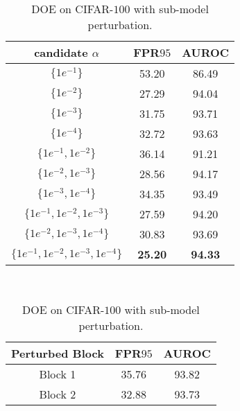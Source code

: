 \documentclass{article} \usepackage{iclr2022_conference,times}
\begin{document}
\begin{table}[t]
\centering
\parbox{.5\linewidth}{
\centering
\scriptsize
\caption{DOE on CIFAR-$100$ with various $\alpha$.} \label{tab: hyper_alpha}
\vspace{5pt}
{
\begin{tabular}{c|cc}
\toprule[1.5pt]
 candidate $\alpha$                     & FPR$95$                & AUROC                  \\
\midrule[0.6pt]
$\{1e^{-1}\}$                           & 53.20                  & 86.49                  \\
$\{1e^{-2}\}$                           & 27.29                  & 94.04                  \\
$\{1e^{-3}\}$                           & 31.75                  & 93.71                  \\
$\{1e^{-4}\}$                           & 32.72                  & 93.63                 \\
$\{1e^{-1},1e^{-2}\}$                   & 36.14                  & 91.21                  \\
$\{1e^{-2},1e^{-3}\}$                   & 28.56                  & 94.17                  \\
$\{1e^{-3},1e^{-4}\}$                   & 34.35                  & 93.49                  \\
$\{1e^{-1},1e^{-2},1e^{-3}\}$           & 27.59                  & 94.20                  \\
$\{1e^{-2},1e^{-3},1e^{-4}\}$           & 30.83                  & 93.69                  \\
\cellcolor{greyL}$\{1e^{-1},1e^{-2},1e^{-3},1e^{-4}\}$   & \cellcolor{greyL}\textbf{25.20}                  & \cellcolor{greyL}\textbf{94.33}                  \\
\bottomrule[1.5pt]      
\end{tabular}
}}~~~~~~~~~~~~~~~
\centering
\parbox{.5\linewidth}{
\centering
\scriptsize
\caption{DOE on CIFAR-$100$ with sub-model perturbation.} \label{tab: hyper_subp}
\vspace{5pt}
{
\begin{tabular}{c|cc}
\toprule[1.5pt]
Perturbed Block                          & FPR$95$                & AUROC                  \\
\midrule[0.6pt]
Block 1                                  & 35.76                  & 93.82                  \\
Block 2                                  & 32.88                  & 93.73                  \\

\end{tabular}}}
\end{table}
\end{document}
